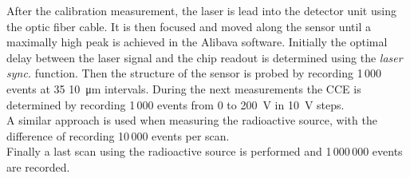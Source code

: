 After the calibration measurement, the laser is lead into the detector unit using the optic fiber cable. It is then focused and moved along the sensor until a maximally high peak is achieved in the Alibava software. Initially the optimal delay between the laser signal and the chip readout is determined using the \textit{laser sync.} function. Then the structure of the sensor is probed by recording 1\,000 events at 35 \qty{10}{\micro\meter} intervals. During the next measurements the CCE is determined by recording 1\,000 events from 0 to \qty{200}{\volt} in \qty{10}{\volt} steps.\\

A similar approach is used when measuring the radioactive source, with the difference of recording 10\,000 events per scan. \\

Finally a last scan using the radioactive source is performed and 1\,000\,000 events are recorded.